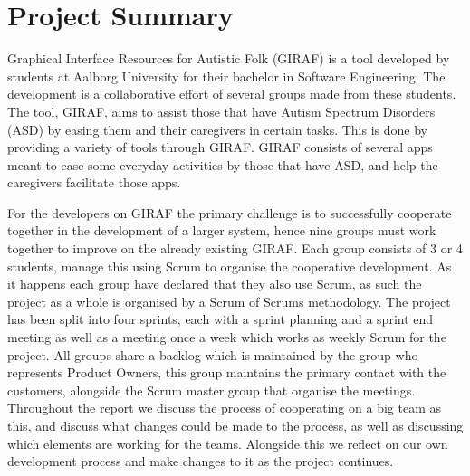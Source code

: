 \chapter*{Project Summary}
Graphical Interface Resources for Autistic Folk (GIRAF) is a tool developed by students at Aalborg University for their bachelor in Software Engineering.
The development is a collaborative effort of several groups made from these students.
The tool, GIRAF, aims to assist those that have Autism Spectrum Disorders (ASD) by easing them and their caregivers in certain tasks.
This is done by providing a variety of tools through GIRAF.
GIRAF consists of several apps meant to ease some everyday activities by those that have ASD, and help the caregivers facilitate those apps.

For the developers on GIRAF the primary challenge is to successfully cooperate together in the development of a larger system, hence nine groups must work together to improve on the already existing GIRAF.
Each group consists of 3 or 4 students, manage this using Scrum to organise the cooperative development.
As it happens each group have declared that they also use Scrum, as such the project as a whole is organised by a Scrum of Scrums methodology.
The project has been split into four sprints, each with a sprint planning and a sprint end meeting as well as a meeting once a week which works as weekly Scrum for the project.
All groups share a backlog which is maintained by the group who represents Product Owners, this group maintains the primary contact with the customers, alongside the Scrum master group that organise the meetings.
Throughout the report we discuss the process of cooperating on a big team as this, and discuss what changes could be made to the process, as well as discussing which elements are working for the teams.
Alongside this we reflect on our own development process and make changes to it as the project continues.

